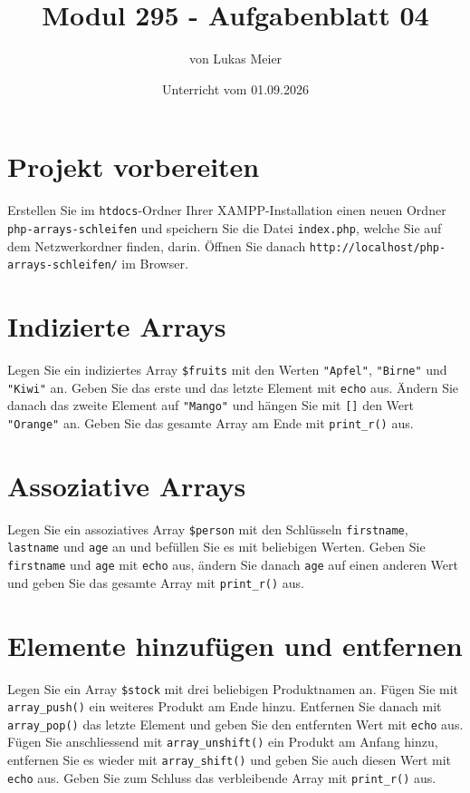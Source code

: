 \documentclass[a4paper,12pt]{article}
\title{Modul 295 - Aufgabenblatt 04}
\author{von Lukas Meier}
\date{Unterricht vom 01.09.2026}
\begin{document}
\maketitle

\section{Projekt vorbereiten}

Erstellen Sie im \texttt{htdocs}-Ordner Ihrer XAMPP-Installation einen neuen Ordner \texttt{php-arrays-schleifen} und speichern Sie die Datei \texttt{index.php}, welche Sie auf dem Netzwerkordner finden, darin. Öffnen Sie danach \texttt{http://localhost/php-arrays-schleifen/} im Browser.

\section{Indizierte Arrays}

Legen Sie ein indiziertes Array \texttt{\$fruits} mit den Werten \texttt{"Apfel"}, \texttt{"Birne"} und \texttt{"Kiwi"} an. Geben Sie das erste und das letzte Element mit \texttt{echo} aus. Ändern Sie danach das zweite Element auf \texttt{"Mango"} und hängen Sie mit \texttt{[]} den Wert \texttt{"Orange"} an. Geben Sie das gesamte Array am Ende mit \texttt{print\_r()} aus.

\section{Assoziative Arrays}

Legen Sie ein assoziatives Array \texttt{\$person} mit den Schlüsseln \texttt{firstname}, \texttt{lastname} und \texttt{age} an und befüllen Sie es mit beliebigen Werten. Geben Sie \texttt{firstname} und \texttt{age} mit \texttt{echo} aus, ändern Sie danach \texttt{age} auf einen anderen Wert und geben Sie das gesamte Array mit \texttt{print\_r()} aus.

\section{Elemente hinzufügen und entfernen}

Legen Sie ein Array \texttt{\$stock} mit drei beliebigen Produktnamen an. Fügen Sie mit \texttt{array\_push()} ein weiteres Produkt am Ende hinzu. Entfernen Sie danach mit \texttt{array\_pop()} das letzte Element und geben Sie den entfernten Wert mit \texttt{echo} aus. Fügen Sie anschliessend mit \texttt{array\_unshift()} ein Produkt am Anfang hinzu, entfernen Sie es wieder mit \texttt{array\_shift()} und geben Sie auch diesen Wert mit \texttt{echo} aus. Geben Sie zum Schluss das verbleibende Array mit \texttt{print\_r()} aus.
\end{document}

